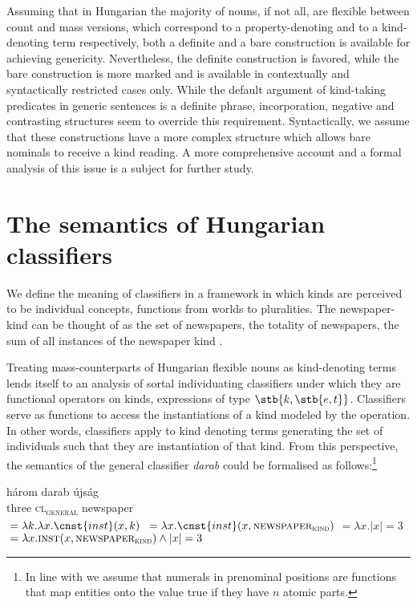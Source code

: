 \documentclass[output=paper]{langscibook}
\begin{document}
Assuming that in Hungarian the majority of nouns, if not all, are flexible between count and mass versions, which correspond to a property-denoting and to a kind-denoting term respectively, both a definite and a bare construction is available for achieving genericity. Nevertheless, the definite construction is favored, while the bare construction is more marked and is available in contextually and syntactically restricted cases only. While the default argument of kind-taking predicates in generic sentences is a definite phrase, incorporation, negative and contrasting structures seem to override this requirement. Syntactically, we assume that these constructions have a more complex structure which allows bare nominals to receive a kind reading. A more comprehensive account and a formal analysis of this issue is a subject for further study. 
   
\section{The semantics of Hungarian classifiers} \label{schv-nem:sec:5}

We define the meaning of classifiers in a framework in which kinds are perceived to be individual concepts, functions from worlds to pluralities. The newspaper-kind can be thought of as the set of newspapers, the totality of newspapers, the sum of all instances of the newspaper kind \citep{chierchia-98b}. 

\begin{sloppypar}
Treating mass-counterparts of Hungarian flexible nouns as kind-denoting terms lends itself to an analysis of sortal individuating classifiers under which they are functional operators on kinds, expressions of type  $\stb{k,\stb{e,t}}$. Classifiers serve as functions to access the instantiations of a kind modeled by the  operation. In other words, classifiers apply to kind denoting terms generating the set of individuals such that they are instantiation of that kind.  From this perspective, the semantics of the general classifier \textit{darab} could be formalised as follows:\footnote{In line with \citet{rothstein17} we assume that numerals in prenominal positions are functions that map entities onto the value true if they have $n$ atomic parts.}
\end{sloppypar}
 

\ea \label{schv-nem:ex:50}
\ea
\gll három darab újság \\
three \textsc{cl\textsubscript{general}} newspaper\\
\ex {}${} = \lambda k. \lambda x.\cnst{inst}(x,k)$
\ex {}${} = \lambda x.\cnst{inst}(x,\textsc{newspaper}_{\textsc{kind}})$
\ex {}${} = \lambda x.  |x| =3$ %
\ex {}${} =  \lambda x.\textsc{inst}(x,\textsc{newspaper}_{\textsc{kind}}) \wedge |x| =3$
\z
\z
\end{document}
